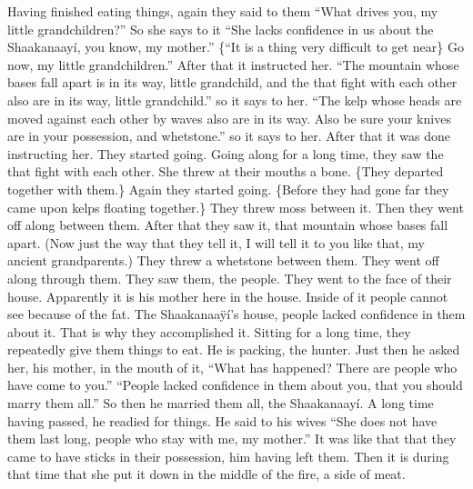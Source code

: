 \begin{pairs}
\begin{Rightside}
Having finished eating things, again they said to them
\qqk{}“What drives you, my little grandchildren?”
So she says to it
\qqk{}“She lacks confidence in us about the Shaakanaayí, you know, my mother.”
\{“It is a thing very difficult to get near\}
Go now, my little grandchildren.”
After that it instructed her.
\qqk{}“The mountain whose bases fall apart is in its way, little grandchild,
and the  that fight with each other also are in its way, little grandchild.”
so it says to her.
\qqk{}“The kelp whose heads are moved against each other by waves also are in its way.
Also be sure your knives are in your possession, and whetstone.”
so it says to her.
After that it was done instructing her.
They started going.
Going along for a long time, they saw the  that fight with each other.
She threw at their mouths a bone.
\{They departed together with them.\}
Again they started going.
\{Before they had gone far they came upon kelps floating together.\}
They threw moss between it.
Then they went off along between them.
After that they saw it, that mountain whose bases fall apart.
(Now just the way that they tell it, I will tell it to you like that, my ancient grandparents.)
They threw a whetstone between them.
They went off along through them.
They saw them, the people.
They went to the face of their house.
\pend
\pstart
{}Apparently it is his mother here in the house.
Inside of it people cannot see because of the fat.
The Shaakanaaÿí’s house, people lacked confidence in them about it.
That is why they accomplished it.
Sitting for a long time, they repeatedly give them things to eat.
He is packing, the hunter.
Just then he asked her, his mother, in the mouth of it,
\qqk{}“What has happened?
There are people who have come to you.”
\qqk{}“People lacked confidence in them about you, that you should marry them all.”
So then he married them all, the Shaakanaayí.
\pend
\pstart
{}A long time having passed, he readied for things.
He said to his wives
\qqk{}“She does not have them last long, people who stay with me, my mother.”
It was like that that they came to have sticks in their possession, him having left them.
Then it is during that time that she put it down in the middle of the fire, a side of meat.

\end{Rightside}
\end{pairs}
